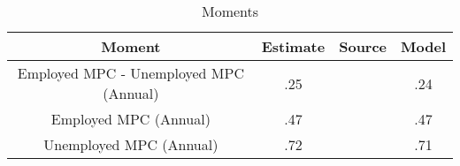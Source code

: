 \begin{table}
\begin{center}\renewcommand{\arraystretch}{1.5}
\caption{Moments}\label{table:Calibration}
\begin{tabular}{|c|ccl|c|}
\hline

Moment                     & \multicolumn{1}{c}{Estimate} & Source & \multicolumn{2}{c|}{Model }\\ \hline
Employed MPC - Unemployed MPC (Annual) & \multicolumn{1}{c}{.25} & \cite{Kekre2021} & \multicolumn{2}{c|}{.24} \\ \hline
Employed MPC  (Annual) & \multicolumn{1}{c}{.47} & \cite{Kekre2021} & \multicolumn{2}{c|}{.47} \\ \hline
Unemployed MPC  (Annual) & \multicolumn{1}{c}{.72} & \cite{Kekre2021} & \multicolumn{2}{c|}{.71} \\ \hline
\end{tabular}
\end{center}
\end{table}